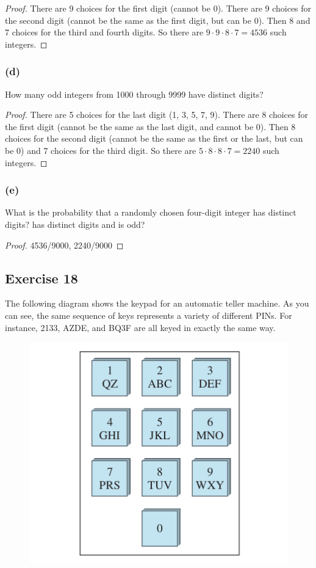 \documentclass[14pt]{extarticle}
\begin{document}
\begin{proof}
There are 9 choices for the first digit (cannot be 0). There are 9 choices for the second digit (cannot be the same as the first digit, but can be 0). Then 8 and 7 choices for the third and fourth digits. So there are  
\(9 \cdot 9 \cdot 8 \cdot 7 = 4536\) such integers.
\end{proof}

\subsubsection{(d)}
How many odd integers from 1000 through 9999 have distinct digits?

\begin{proof}
There are 5 choices for the last digit (1, 3, 5, 7, 9). There are 8 choices for the first digit (cannot be the 
same as the last digit, and cannot be 0). Then 8 choices for the second digit (cannot be the same as the first or 
the last, but can be 0) and 7 choices for the third digit. So there are \(5 \cdot 8 \cdot 8 \cdot 7 = 2240\) such 
integers.
\end{proof}

\subsubsection{(e)}
What is the probability that a randomly chosen four-digit integer has distinct digits? has distinct digits and is odd?

\begin{proof}
4536/9000, 2240/9000
\end{proof}

\subsection{Exercise 18}
The following diagram shows the keypad for an automatic teller machine. As you can see, the same sequence of keys 
represents a variety of different PINs. For instance, 2133, AZDE, and BQ3F are all keyed in exactly the same way.

\begin{figure}[ht!]
\centering
\includegraphics[scale=0.5]{../images/9.2.18.png}
\end{figure}
\end{document}
